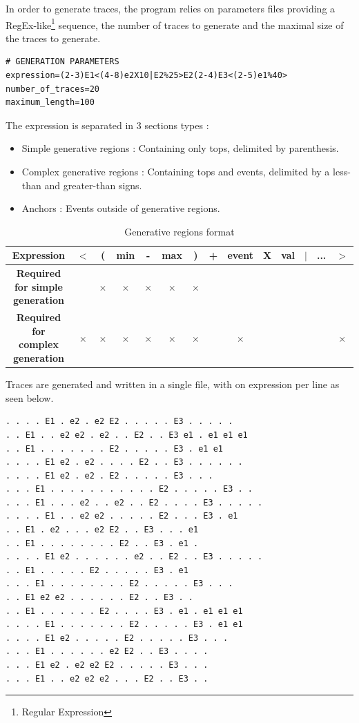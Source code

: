 \documentclass[12pt,a4paper]{article}
\begin{document}
In order to generate traces, the program relies on parameters files providing a RegEx-like\footnote{Regular Expression} sequence, the number of traces to generate and the maximal size of the traces to generate.

\begin{lstlisting}[caption={Parameter file structure}]
# GENERATION PARAMETERS
expression=(2-3)E1<(4-8)e2X10|E2%25>E2(2-4)E3<(2-5)e1%40>
number_of_traces=20
maximum_length=100
\end{lstlisting}

The expression is separated in 3 sections types :
\begin{itemize}
	\item Simple generative regions : Containing only tops, delimited by parenthesis.
	\item Complex generative regions : Containing tops and events, delimited by a less-than and greater-than signs.
	\item Anchors : Events outside of generative regions.
\end{itemize}

\begin{table}[H]
	\begin{center}
		\caption{Generative regions format}
		\begin{tabular}{|c|c|c|c|c|c|c|c|c|c|c|c|c|c|}
			\hline
			\textbf{Expression} & $<$ & ( & min & - & max & ) & + & event & X & val & $|$ & ... & $>$ \\
			\hline
			\textbf{Required for simple generation} && $\times$ & $\times$ & $\times$ & $\times$ & $\times$ &&&&&&& \\
			\hline
			\textbf{Required for complex generation} & $\times$ & $\times$ & $\times$ & $\times$ & $\times$ & $\times$ && $\times$ &&&&& $\times$ \\
			\hline
		\end{tabular}
	\end{center}
\end{table}

Traces are generated and written in a single file, with on expression per line as seen below.

\begin{lstlisting}[caption={Traces generated from expression (2-3)E1$<$(4-8)e2X10$|$E2\%25$>$E2(2-4)E3$<$(2-5)e1\%40$>$}]
. . . . E1 . e2 . e2 E2 . . . . . E3 . . . . .
. . E1 . . e2 e2 . e2 . . E2 . . E3 e1 . e1 e1 e1
. . E1 . . . . . . . E2 . . . . . E3 . e1 e1
. . . . E1 e2 . e2 . . . . E2 . . E3 . . . . . .
. . . . E1 e2 . e2 . E2 . . . . . E3 . . .
. . . E1 . . . . . . . . . . . E2 . . . . . E3 . .
. . . E1 . . . e2 . . e2 . . E2 . . . . E3 . . . . .
. . . . E1 . . e2 e2 . . . . . E2 . . . E3 . e1
. . E1 . e2 . . . e2 E2 . . E3 . . . e1
. . E1 . . . . . . . . E2 . . E3 . e1 .
. . . . E1 e2 . . . . . . e2 . . E2 . . E3 . . . . .
. . E1 . . . . . E2 . . . . . E3 . e1
. . . E1 . . . . . . . . E2 . . . . . E3 . . .
. . E1 e2 e2 . . . . . . E2 . . E3 . .
. . E1 . . . . . . E2 . . . . E3 . e1 . e1 e1 e1
. . . . E1 . . . . . . . E2 . . . . . E3 . e1 e1
. . . . E1 e2 . . . . . E2 . . . . . E3 . . .
. . . E1 . . . . . . e2 E2 . . E3 . . . .
. . . E1 e2 . e2 e2 E2 . . . . . E3 . . .
. . . E1 . . e2 e2 e2 . . . E2 . . E3 . .
\end{lstlisting}
\end{document}
